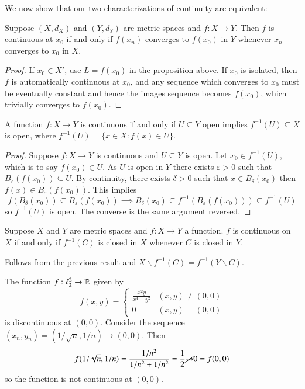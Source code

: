 We now show that our two characterizations of continuity are equivalent:


\begin{prop}
    Suppose $(X,d_X)$ and $(Y,d_Y)$ are metric spaces and $f:X\rightarrow Y$. Then $f$ is continuous at $x_0$ if and only if $f(x_n)$ converges to $f(x_0)$ in $Y$ whenever $x_n$ converges to $x_0$ in $X$.
\end{prop}
\begin{proof}
    If $x_0 \in X'$, use $L = f(x_0)$ in the proposition above. If $x_0$ is isolated, then $f$ is automatically continuous at $x_0$, and any sequence which converges to $x_0$ must be eventually constant and hence the images sequence becomes $f(x_0)$, which trivially converges to $f(x_0)$.
\end{proof}


\begin{prop}\label{prop:3.1.1}
    A function $f:X\rightarrow Y$ is continuous if and only if $U \subseteq Y$ open implies $f^{-1}(U) \subseteq X$ is open, where $f^{-1}(U) = \{x \in X:f(x) \in U\}$.
\end{prop}
\begin{proof}
    Suppose $f:X\rightarrow Y$ is continuous and $U \subseteq Y$ is open. Let $x_0 \in f^{-1}(U)$, which is to say $f(x_0) \in U$. As $U$ is open in $Y$ there exists $\varepsilon > 0$ such that $B_{\varepsilon}(f(x_0)) \subseteq U$. By continuity, there exists $\delta > 0$ such that $x \in B_{\delta}(x_0)$ then $f(x) \in B_{\varepsilon}(f(x_0))$. This implies $$f(B_{\delta}(x_0)) \subseteq B_{\varepsilon}(f(x_0)) \implies B_{\delta}(x_0) \subseteq f^{-1}(B_{\varepsilon}(f(x_0))) \subseteq f^{-1}(U)$$ so $f^{-1}(U)$ is open. The converse is the same argument reversed.
\end{proof}

\begin{cor}
    Suppose $X$ and $Y$ are metric spaces and $f:X\rightarrow Y$ a function. $f$ is continuous on $X$ if and only if $f^{-1}(C)$ is closed in $X$ whenever $C$ is closed in $Y$.
\end{cor}

Follows from the previous result and $X\backslash f^{-1}(C) = f^{-1}(Y\backslash C)$.

\begin{eg}
    The function $f:\ell_2^2\rightarrow \mathbb R$ given by $$f(x,y) = \left\{\begin{array}{cc} \frac{x^2y}{x^4+y^2} & (x,y)\neq (0,0) \\ 0 & (x,y) = (0,0) \end{array}\right.$$ is discontinuous at $(0,0)$. Consider the sequence $(x_n,y_n) = (1/\sqrt{n},1/n)\rightarrow (0,0)$. Then $$f(1/\sqrt{n},1/n) = \frac{1/n^2}{1/n^2+1/n^2} = \frac{1}{2}\cancel{\rightarrow} 0 = f(0,0)$$ so the function is not continuous at $(0,0)$.
\end{eg}

